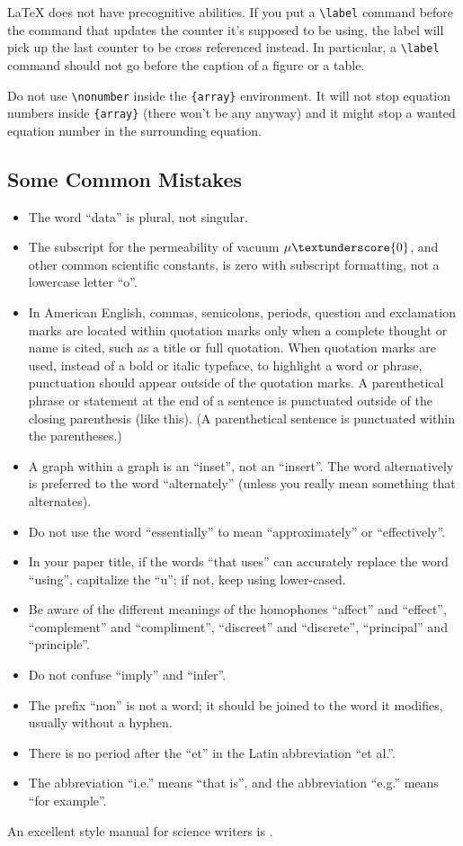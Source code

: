 \documentclass[conference]{IEEEtran}
\begin{document}
{\LaTeX} does not have precognitive abilities. If you put a
\verb|\label| command before the command that updates the counter it's
supposed to be using, the label will pick up the last counter to be
cross referenced instead. In particular, a \verb|\label| command
should not go before the caption of a figure or a table.

Do not use \verb|\nonumber| inside the \verb|{array}| environment. It
will not stop equation numbers inside \verb|{array}| (there won't be
any anyway) and it might stop a wanted equation number in the
surrounding equation.

\subsection{Some Common Mistakes}\label{SCM}
\begin{itemize}
\item The word ``data'' is plural, not singular.
\item The subscript for the permeability of vacuum $\mu\textunderscore {0}$, and other common scientific constants, is zero with subscript formatting, not a lowercase letter ``o''.
\item In American English, commas, semicolons, periods, question and exclamation marks are located within quotation marks only when a complete thought or name is cited, such as a title or full quotation. When quotation marks are used, instead of a bold or italic typeface, to highlight a word or phrase, punctuation should appear outside of the quotation marks. A parenthetical phrase or statement at the end of a sentence is punctuated outside of the closing parenthesis (like this). (A parenthetical sentence is punctuated within the parentheses.)
\item A graph within a graph is an ``inset'', not an ``insert''. The word alternatively is preferred to the word ``alternately'' (unless you really mean something that alternates).
\item Do not use the word ``essentially'' to mean ``approximately'' or ``effectively''.
\item In your paper title, if the words ``that uses'' can accurately replace the word ``using'', capitalize the ``u''; if not, keep using lower-cased.
\item Be aware of the different meanings of the homophones ``affect'' and ``effect'', ``complement'' and ``compliment'', ``discreet'' and ``discrete'', ``principal'' and ``principle''.
\item Do not confuse ``imply'' and ``infer''.
\item The prefix ``non'' is not a word; it should be joined to the word it modifies, usually without a hyphen.
\item There is no period after the ``et'' in the Latin abbreviation ``et al.''.
\item The abbreviation ``i.e.'' means ``that is'', and the abbreviation ``e.g.'' means ``for example''.
\end{itemize}
An excellent style manual for science writers is \cite{b7}.
\end{document}
